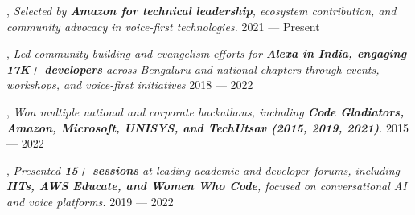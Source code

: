 \begin{zitemize}
\item {}, \textit{Selected by \textbf{Amazon for technical leadership}, ecosystem contribution, and community advocacy in voice-first technologies.} \hfill {\color{highlight} 2021 --- Present}
\item {}, \textit{Led community-building and evangelism efforts for \textbf{Alexa in India, engaging 17K+ developers} across Bengaluru and national chapters through events, workshops, and voice-first initiatives} \hfill {\color{highlight} 2018 --- 2022}
\item {}, \textit{Won multiple national and corporate hackathons, including \textbf{Code Gladiators, Amazon, Microsoft, UNISYS, and TechUtsav (2015, 2019, 2021)}.} \hfill {\color{highlight} 2015 --- 2022}
\item {}, \textit{Presented \textbf{15+ sessions} at leading academic and developer forums, including \textbf{IITs, AWS Educate, and Women Who Code}, focused on conversational AI and voice platforms.} \hfill {\color{highlight} 2019 --- 2022}
\end{zitemize}